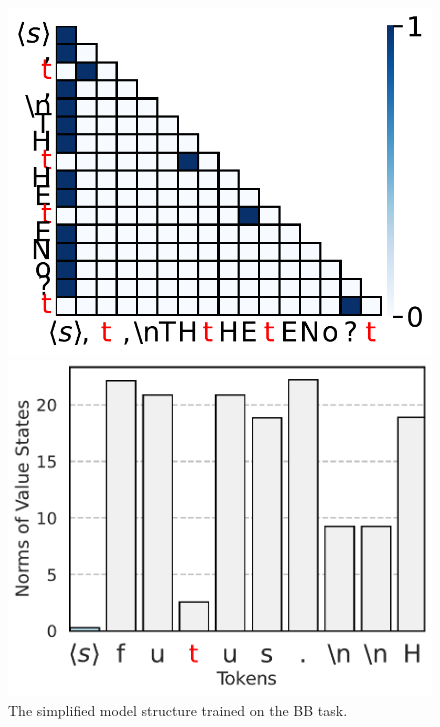\begin{figure}[h]
  \centering
  \begin{minipage}{0.3\textwidth}
      \centering
      \vspace{-.2em}
      \includegraphics[width=\linewidth]{Figures/BBM_appendix/simple_attn_fig0.pdf}
  \end{minipage}
  \begin{minipage}{0.3\textwidth}
      \centering
      \vspace{-.2em}
      \includegraphics[width=\linewidth]{Figures/BBM_appendix/simple_value_states_layer_0.pdf}
  \end{minipage}
  \caption{\small The simplified model structure trained on the BB task.}
  \label{appfigure:simple-static}
  \vspace{-1em}
\end{figure}

